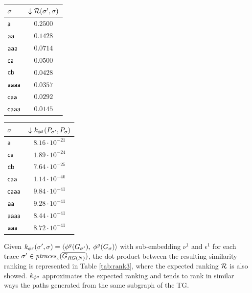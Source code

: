 \begin{table}[!t]
{\begin{tabular}{l|c}
	{$\trace$} &
	{$\boldsymbol{\downarrow}\goldenrank(\nonlogtrace,\logtrace)$} \\
	
	
	\midrule
	$\const{a}$  &  $0.2500$ \\
	$\const{aa}$  &  $0.1428$  \\
	$\const{aaa}$  & $0.0714$ \\
	$\const{ca}$  &   $0.0500$\\
	$\const{cb}$  & $0.0428$ \\
	$\const{aaaa}$  &  $0.0357$ \\
	$\const{caa}$  &  $0.0292$ \\
	$\const{caaa}$  &   $0.0145$ \\
	\bottomrule
\end{tabular}\quad	\begin{tabular}{l|c}
	\toprule
	
	{$\trace$} &
	{$\boldsymbol{\downarrow}k_{\gorgembed}(P_\nonlogtrace,P_{\logtrace})$} \\

	
	\midrule
	$\const{a}$  & $8.16\cdot 10^{-21}$ \\
	$\const{ca}$  &   $1.89\cdot 10^{-24}$\\
	$\const{cb}$  &   $7.64\cdot 10^{-25}$\\
	$\const{caa}$  &$1.14\cdot 10^{-40}$\\
	$\const{caaa}$  &  $9.84\cdot 10^{-41}$\\
	$\const{aa}$  &  $9.28\cdot 10^{-41}$ \\
	$\const{aaaa}$  & $8.44\cdot 10^{-41}$\\
	$\const{aaa}$  &  $8.72\cdot 10^{-41}$\\
	\bottomrule
\end{tabular}}
\end{table}




\begin{example}\small \label{ex:11}
	Given $k_{\gorgembed}(\nonlogtrace,\logtrace)=\braket{\gorgembed(G_\nonlogtrace),\;\gorgembed(G_{\logtrace})}$ with sub-embedding $\nu^1$ and $\epsilon^1$ for each  trace $\nonlogtrace\in\WCal{\varepsilon}{4}$,  the dot product between the resulting similarity ranking is represented in Table \ref{tab:rank3}, where the expected ranking $\goldenrank$ is also showed. $k_{\gorgembed}$ approximates the expected ranking  and tends to rank in similar ways the paths generated from the same subgraph of the TG.
\end{example}


